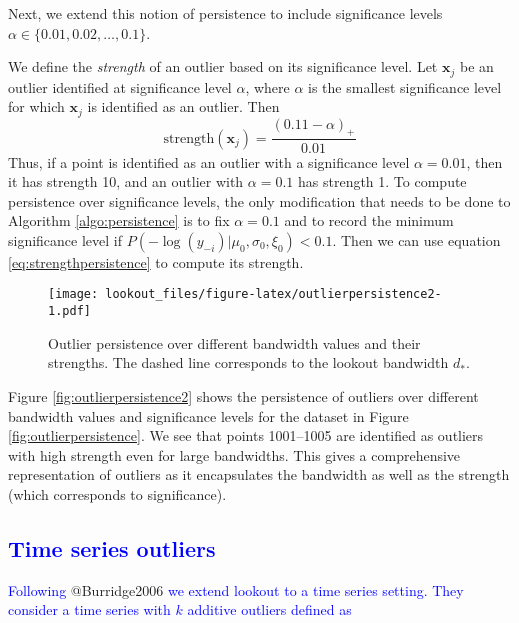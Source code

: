 \documentclass[
]{article}
\begin{document}
Next, we extend this notion of persistence to include significance
levels \(\alpha \in \{0.01, 0.02, \dots, 0.1 \}\).

We define the \emph{strength} of an outlier based on its significance
level. Let \(\bm{x}_j\) be an outlier identified at significance level
\(\alpha\), where \(\alpha\) is the smallest significance level for
which \(\bm{x}_j\) is identified as an outlier. Then
\begin{equation}\label{eq:strengthpersistence}
    \text{strength} (\bm{x}_j) = \frac{(0.11 - \alpha)_+}{0.01}
\end{equation} Thus, if a point is identified as an outlier with a
significance level \(\alpha = 0.01\), then it has strength 10, and an
outlier with \(\alpha = 0.1\) has strength 1. To compute persistence
over significance levels, the only modification that needs to be done to
Algorithm \ref{algo:persistence} is to fix \(\alpha = 0.1\) and to
record the minimum significance level if
\(P\left(-\log(y_{-i})|\mu_0, \sigma_0, \xi_0 \right) < 0.1\). Then we
can use equation \eqref{eq:strengthpersistence} to compute its strength.

\begin{figure}
\centering
\texttt{[image: lookout\_files/figure-latex/outlierpersistence2-1.pdf]}
\caption{Outlier persistence over different bandwidth values and their
strengths. The dashed line corresponds to the lookout bandwidth
\(d_*\).}
\end{figure}

Figure \ref{fig:outlierpersistence2} shows the persistence of outliers
over different bandwidth values and significance levels for the dataset
in Figure \ref{fig:outlierpersistence}. We see that points 1001--1005
are identified as outliers with high strength even for large bandwidths.
This gives a comprehensive representation of outliers as it encapsulates
the bandwidth as well as the strength (which corresponds to
significance).

\hypertarget{sec:timeseriesoutiers}{%
\subsection{\texorpdfstring{\textcolor{blue}{Time series outliers}}{}}\label{sec:timeseriesoutiers}}

\textcolor{blue}{Following} @Burridge2006
\textcolor{blue}{we extend lookout to a time series setting. They consider a time series with $k$ additive outliers defined as }
\end{document}
